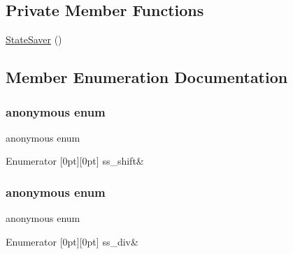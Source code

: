 \subsection*{Private Member Functions}
\begin{DoxyCompactItemize}
\item 
\hyperlink{classgambatte_1_1StateSaver_a90d9649f1f12948209b6b7b00567b765}{State\+Saver} ()
\end{DoxyCompactItemize}


\subsection{Member Enumeration Documentation}
\mbox{\label{classgambatte_1_1StateSaver_ae198109f1afd0eeae59a056efb659a62}} 
\subsubsection{\texorpdfstring{anonymous enum}{anonymous enum}}
{\footnotesize\ttfamily anonymous enum}

\begin{DoxyEnumFields}{Enumerator}
[0pt][0pt]{}\mbox{\label{classgambatte_1_1StateSaver_ae198109f1afd0eeae59a056efb659a62a796008c573f248ed2df587a64bd2c56a}} 
ss\+\_\+shift&\\
\hline

\end{DoxyEnumFields}
\mbox{\label{classgambatte_1_1StateSaver_a7a727a444a7f39b775b6fa00a4d8b7b7}} 
\subsubsection{\texorpdfstring{anonymous enum}{anonymous enum}}
{\footnotesize\ttfamily anonymous enum}

\begin{DoxyEnumFields}{Enumerator}
[0pt][0pt]{}\mbox{\label{classgambatte_1_1StateSaver_a7a727a444a7f39b775b6fa00a4d8b7b7a57157847503e09dbb1b5c83a7fe98ace}} 
ss\+\_\+div&\\
\hline

\end{DoxyEnumFields}
\mbox{\label{classgambatte_1_1StateSaver_a37f3c4400dc9ae31ee260a16dc580a63}} 
